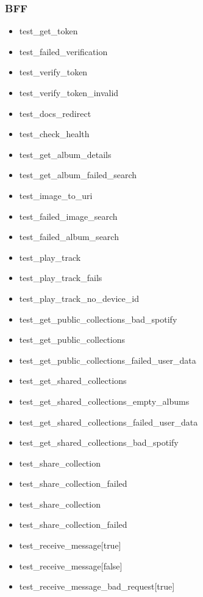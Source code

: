 \subsubsection{BFF}
\begin{multicols}{2}
    \begin{itemize}
        \item test\_get\_token
        \item test\_failed\_verification
        \item test\_verify\_token
        \item test\_verify\_token\_invalid
        \item test\_docs\_redirect
        \item test\_check\_health
        \item test\_get\_album\_details
        \item test\_get\_album\_failed\_search
        \item test\_image\_to\_uri
        \item test\_failed\_image\_search
        \item test\_failed\_album\_search
        \item test\_play\_track
        \item test\_play\_track\_fails
        \item test\_play\_track\_no\_device\_id
        \item test\_get\_public\_collections\_bad\_spotify
        \item test\_get\_public\_collections
        \item test\_get\_public\_collections\_failed\_user\_data
        \item test\_get\_shared\_collections
        \item test\_get\_shared\_collections\_empty\_albums
        \item test\_get\_shared\_collections\_failed\_user\_data
        \item test\_get\_shared\_collections\_bad\_spotify
        \item test\_share\_collection
        \item test\_share\_collection\_failed
        \item test\_share\_collection
        \item test\_share\_collection\_failed
        \item test\_receive\_message[true]
        \item test\_receive\_message[false]
        \item test\_receive\_message\_bad\_request[true]

\end{itemize}
\end{multicols}
